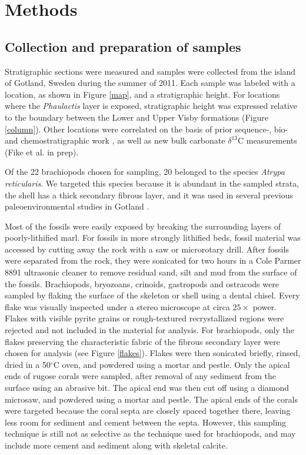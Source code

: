 \documentclass[5p, authoryear]{elsarticle}
\begin{document}
\section{Methods}

\subsection{Collection and preparation of samples}

Stratigraphic sections were measured and samples were collected from the island of Gotland, Sweden during the summer of 2011. Each sample was labeled with a location, as shown in Figure \ref{map}, and a stratigraphic height. For locations where the \textit{Phaulactis} layer is exposed, stratigraphic height was expressed relative to the boundary between the Lower and Upper Visby formations (Figure \ref{column}). Other locations were correlated on the basis of prior sequence-, bio- and chemostratigraphic work \citep{Calner2004a}, as well as new bulk carbonate $\delta^{13}$C measurements (Fike et al. in prep).

Of the 22 brachiopods chosen for sampling, 20 belonged to the species \textit{Atrypa reticularis}. We targeted this species because it is abundant in the sampled strata, the shell has a thick secondary fibrous layer, and it was used in several previous paleoenvironmental studies in Gotland \citep{Bickert1997, Munnecke2003, Samtleben2001}. 

Most of the fossils were easily exposed by breaking the surrounding layers of poorly-lithified marl. For fossils in more strongly lithified beds, fossil material was accessed by cutting away the rock with a saw or microrotary drill. After fossils were separated from the rock, they were sonicated for two hours in a Cole Parmer 8891 ultrasonic cleaner to remove residual sand, silt and mud from the surface of the fossils. Brachiopods, bryozoans, crinoids, gastropods and ostracods were sampled by flaking the surface of the skeleton or shell using a dental chisel. Every flake was visually inspected under a stereo microscope at circa $25\times$ power. Flakes with visible pyrite grains or rough-textured recrystallized regions were rejected and not included in the material for analysis. For brachiopods, only the flakes preserving the characteristic fabric of the fibrous secondary layer were chosen for analysis (see Figure \ref{flakes}). Flakes were then sonicated briefly, rinsed, dried in a 50$^{\circ}$C oven, and powdered using a mortar and pestle. Only the apical ends of rugose corals were sampled, after removal of any sediment from the surface using an abrasive bit. The apical end was then cut off using a diamond microsaw, and powdered using a mortar and pestle. The apical ends of the corals were targeted because the coral septa are closely spaced together there, leaving less room for sediment and cement between the septa. However, this sampling technique is still not as selective as the technique used for brachiopods, and may include more cement and sediment along with skeletal calcite. 
\end{document}
